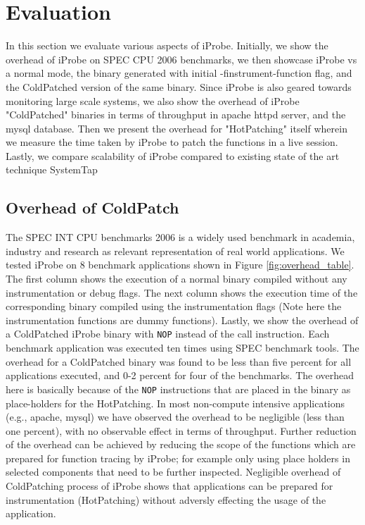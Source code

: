
\section{Evaluation}
\label{sec:eval}

In this section we evaluate various aspects of iProbe. Initially, we show the overhead of iProbe on SPEC CPU 2006 benchmarks\cite{specCPU2006}, we then showcase iProbe vs a normal mode, the binary generated with initial -finstrument-function flag, and the ColdPatched version of the same binary. 
Since iProbe is also geared towards monitoring large scale systems, we also show the overhead of iProbe "ColdPatched" binaries in terms of throughput in apache httpd server, and the mysql database. 
Then we present the overhead for "HotPatching" itself wherein we measure the time taken by iProbe to patch the functions in a live session. Lastly, we compare scalability of iProbe compared to existing state of the art technique SystemTap \cite{systemtap}

\subsection{Overhead of ColdPatch}
The SPEC INT CPU benchmarks 2006 \cite{specCPU2006} is a widely used benchmark in academia, industry and research as relevant representation of real world applications. 
We tested iProbe on 8 benchmark applications shown in Figure \ref{fig:overhead_table}. The first column shows the execution of a normal binary compiled without any instrumentation or debug flags. 
The next column shows the execution time of the corresponding binary compiled using the instrumentation flags (Note here the instrumentation functions are dummy functions). 
Lastly, we show the overhead of a ColdPatched iProbe binary with \texttt{NOP} instead of the call instruction. 
Each benchmark application was executed ten times using SPEC benchmark tools. 
The overhead for a ColdPatched binary was found to be less than five percent for all applications executed, and 0-2 percent for four of the benchmarks. 
The overhead here is basically because of the \texttt{NOP} instructions that are placed in the binary as place-holders for the HotPatching. 
In most non-compute intensive applications (e.g., apache, mysql) we have observed the overhead to be negligible (less than one percent), with no observable effect in terms of throughput. 
Further reduction of the overhead can be achieved by reducing the scope of the functions which are prepared for function tracing by iProbe; for example only using place holders in selected components that need to be further inspected. 
Negligible overhead of ColdPatching process of iProbe shows that applications can be prepared for instrumentation (HotPatching) without adversly effecting the usage of the application.

